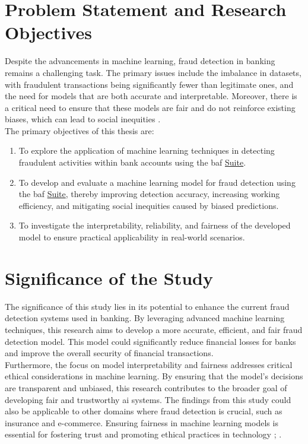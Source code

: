 \documentclass[12pt,a4paper]{report}
\begin{document}
\section{Problem Statement and Research Objectives}
Despite the advancements in machine learning, fraud detection in banking remains a challenging task. The primary issues include the imbalance in datasets, with fraudulent transactions being significantly fewer than legitimate ones, and the need for models that are both accurate and interpretable. Moreover, there is a critical need to ensure that these models are fair and do not reinforce existing biases, which can lead to social inequities \citep{corbett2023measure}.\\



The primary objectives of this thesis are:
\begin{enumerate}
    \item To explore the application of machine learning techniques in detecting fraudulent activities within bank accounts using the \acrshort{baf} \href{https://www.kaggle.com/datasets/sgpjesus/bank-account-fraud-dataset-neurips-2022/code}{Suite}.\\
    \item To develop and evaluate a machine learning model for fraud detection using the \acrshort{baf} \href{https://www.kaggle.com/datasets/sgpjesus/bank-account-fraud-dataset-neurips-2022/code}{Suite}, thereby improving detection accuracy, increasing working efficiency, and mitigating social inequities caused by biased predictions.
    \item To investigate the interpretability, reliability, and fairness of the developed model to ensure practical applicability in real-world scenarios.
\end{enumerate}


\section{Significance of the Study}
The significance of this study lies in its potential to enhance the current fraud detection systems used in banking. By leveraging advanced machine learning techniques, this research aims to develop a more accurate, efficient, and fair fraud detection model. This model could significantly reduce financial losses for banks and improve the overall security of financial transactions.\\

Furthermore, the focus on model interpretability and fairness addresses critical ethical considerations in machine learning. By ensuring that the model’s decisions are transparent and unbiased, this research contributes to the broader goal of developing fair and trustworthy \acrshort{ai} systems. The findings from this study could also be applicable to other domains where fraud detection is crucial, such as insurance and e-commerce. Ensuring fairness in machine learning models is essential for fostering trust and promoting ethical practices in technology \citep{barocas2023fairness}; \citep{mehrabi2021survey}.\\
\end{document}
